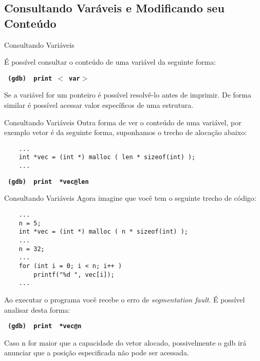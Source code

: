 \subsection{ Consultando Varáveis e Modificando seu Conteúdo }
\frame{\tableofcontents[
    currentsection,
    currentsubsection,
    subsectionstyle=show/shaded/hide
]}
\begin{frame}[fragile]{Consultando Variáveis}

    É possível consultar o conteúdo de uma variável da seguinte forma:
    
    \begin{center}
        \small
        \texttt{ \textbf{ (gdb) {\color{blue} print} $<${\color{red} var}$>$ }}
    \end{center}
    Se a variável for um ponteiro é possível resolvê-lo antes de imprimir. De forma similar é possível acessar valor específicos de uma estrutura.

\end{frame}

\begin{frame}[fragile]{Consultando Variáveis}
    Outra forma de ver o conteúdo de uma variável, por exemplo vetor é da seguinte forma, suponhamos o trecho de alocação abaixo:
    
    \begin{lstlisting}
    ...
    int *vec = (int *) malloc ( len * sizeof(int) );
    ...
    \end{lstlisting}
    
    \begin{center}
        \small
        \texttt{ \textbf{ (gdb) {\color{blue} print} {\color{red} *vec@len} }}
    \end{center}
\end{frame}

\begin{frame}[fragile]{Consultando Variáveis}
    Agora imagine que você tem o seguinte trecho de código:
    \begin{lstlisting}
    ...
    n = 5;
    int *vec = (int *) malloc ( n * sizeof(int) );
    ...
    n = 32;
    ...
    for (int i = 0; i < n; i++ )
        printf("%d ", vec[i]);
    ...
    \end{lstlisting}
    
    Ao executar o programa você recebe o erro de \textit{segmentation fault}. É possível analisar desta forma: 
    \begin{center}
        \small
        \texttt{ \textbf{ (gdb) {\color{blue} print} {\color{red} *vec@n} }}
    \end{center}
    Caso n for maior que a capacidade do vetor alocado, possivelmente o gdb irá anunciar que a posição especificada não pode ser acessada.
\end{frame}

